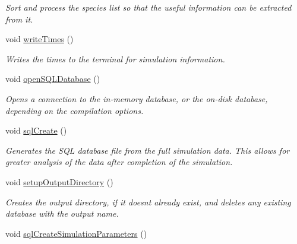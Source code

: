 \begin{DoxyCompactItemize}
\begin{DoxyCompactList}\small\item\em Sort and process the species list so that the useful information can be extracted from it. \end{DoxyCompactList}\item 
void \hyperlink{class_tree_ab8785fc9e27868a56335048321c13290}{write\+Times} ()\hypertarget{class_tree_ab8785fc9e27868a56335048321c13290}{}\label{class_tree_ab8785fc9e27868a56335048321c13290}

\begin{DoxyCompactList}\small\item\em Writes the times to the terminal for simulation information. \end{DoxyCompactList}\item 
void \hyperlink{class_tree_a9e240bbfc3139b290a0dead741f560bf}{open\+S\+Q\+L\+Database} ()\hypertarget{class_tree_a9e240bbfc3139b290a0dead741f560bf}{}\label{class_tree_a9e240bbfc3139b290a0dead741f560bf}

\begin{DoxyCompactList}\small\item\em Opens a connection to the in-\/memory database, or the on-\/disk database, depending on the compilation options. \end{DoxyCompactList}\item 
void \hyperlink{class_tree_ae784a6ed362f6c5263ee797759f715b6}{sql\+Create} ()\hypertarget{class_tree_ae784a6ed362f6c5263ee797759f715b6}{}\label{class_tree_ae784a6ed362f6c5263ee797759f715b6}

\begin{DoxyCompactList}\small\item\em Generates the S\+QL database file from the full simulation data. This allows for greater analysis of the data after completion of the simulation. \end{DoxyCompactList}\item 
void \hyperlink{class_tree_aea2222fa1237ba2e72f516c2b6bb02c9}{setup\+Output\+Directory} ()\hypertarget{class_tree_aea2222fa1237ba2e72f516c2b6bb02c9}{}\label{class_tree_aea2222fa1237ba2e72f516c2b6bb02c9}

\begin{DoxyCompactList}\small\item\em Creates the output directory, if it doesn\textquotesingle{}t already exist, and deletes any existing database with the output name. \end{DoxyCompactList}\item 
void \hyperlink{class_tree_a199f47b62b9b10917ff8b89d20c543a7}{sql\+Create\+Simulation\+Parameters} ()\hypertarget{class_tree_a199f47b62b9b10917ff8b89d20c543a7}{}\label{class_tree_a199f47b62b9b10917ff8b89d20c543a7}


\end{DoxyCompactItemize}
